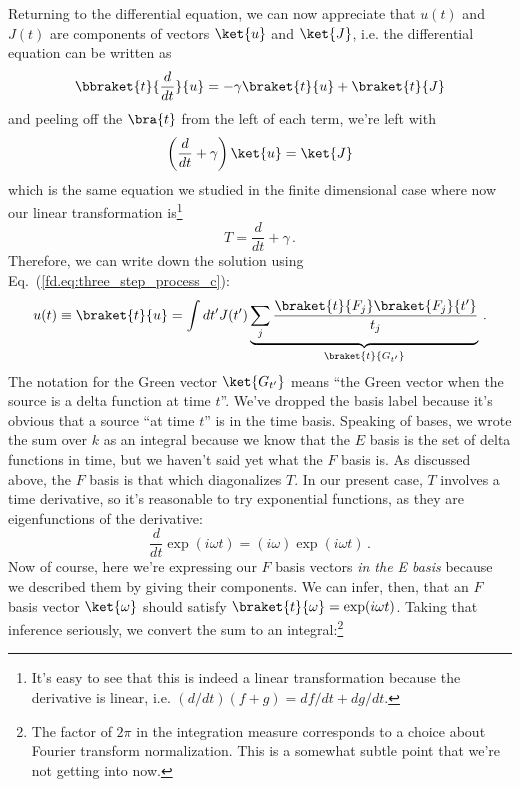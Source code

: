 Returning to the differential equation, we can now appreciate that $u(t)$ and $J(t)$ are components of vectors $\ket{u}$ and $\ket{J}$, i.e. the differential equation can be written as
\begin{equation*}
  \bbraket{t}{\frac{d}{dt}}{u} = - \gamma \braket{t}{u} + \braket{t}{J}
\end{equation*}
and peeling off the $\bra{t}$ from the left of each term, we're left with
\begin{equation}
  \left( \frac{d}{dt} + \gamma \right) \ket{u} = \ket{J}
\end{equation}
which is the same equation we studied in the finite dimensional case where now our linear transformation is\footnote{It's easy to see that this is indeed a linear transformation because the derivative is linear, i.e. $(d/dt)(f + g) = df/dt + dg/dt$.}
\begin{equation}
  T = \frac{d}{dt} + \gamma \, .
\end{equation}
Therefore, we can write down the solution using Eq.~(\ref{fd.eq:three_step_process_c}):
\begin{equation}
  u(t) \equiv \braket{t}{u} = \int dt' J(t')
  \underbrace{\sum_j \frac{\braket{t}{F_j}\braket{F_j}{t'}}{t_j}}_{\braket{t}{G_{t'}}}
  \, .
  \label{eq:green_function_solution_mixed}
\end{equation}
The notation for the Green vector $\ket{G_{t'}}$ means ``the Green vector when the source is a delta function at time $t$''.
We've dropped the basis label because it's obvious that a source ``at time $t$'' is in the time basis.
Speaking of bases, we wrote the sum over $k$ as an integral because we know that the $E$ basis is the set of delta functions in time, but we haven't said yet what the $F$ basis is.
As discussed above, the $F$ basis is that which diagonalizes $T$.
In our present case, $T$ involves a time derivative, so it's reasonable to try exponential functions, as they are eigenfunctions of the derivative:
\begin{equation*}
  \frac{d}{dt} \exp(i \omega t) = (i \omega) \exp(i\omega t)
  \, .
\end{equation*}
Now of course, here we're expressing our $F$ basis vectors \emph{in the E basis} because we described them by giving their components.
We can infer, then, that an $F$ basis vector $\ket{\omega}$ should satisfy $\braket{t}{\omega} = \exp(i \omega t)$.
Taking that inference seriously, we convert the sum to an integral:\footnote{The factor of $2\pi$ in the integration measure corresponds to a choice about Fourier transform normalization. This is a somewhat subtle point that we're not getting into now.}
